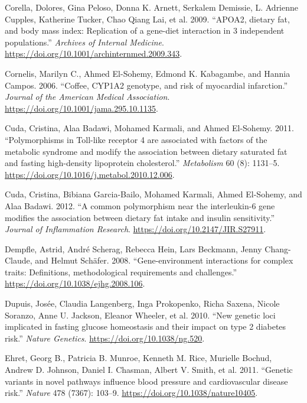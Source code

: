 \documentclass[]{article}
\begin{document}
\leavevmode\hypertarget{ref-Corella2009}{}%
Corella, Dolores, Gina Peloso, Donna K. Arnett, Serkalem Demissie, L.
Adrienne Cupples, Katherine Tucker, Chao Qiang Lai, et al. 2009.
``APOA2, dietary fat, and body mass index: Replication of a gene-diet
interaction in 3 independent populations.'' \emph{Archives of Internal
Medicine}. \url{https://doi.org/10.1001/archinternmed.2009.343}.

\leavevmode\hypertarget{ref-Cornelis2006}{}%
Cornelis, Marilyn C., Ahmed El-Sohemy, Edmond K. Kabagambe, and Hannia
Campos. 2006. ``Coffee, CYP1A2 genotype, and risk of myocardial
infarction.'' \emph{Journal of the American Medical Association}.
\url{https://doi.org/10.1001/jama.295.10.1135}.

\leavevmode\hypertarget{ref-Cuda2011}{}%
Cuda, Cristina, Alaa Badawi, Mohamed Karmali, and Ahmed El-Sohemy. 2011.
``Polymorphisms in Toll-like receptor 4 are associated with factors of
the metabolic syndrome and modify the association between dietary
saturated fat and fasting high-density lipoprotein cholesterol.''
\emph{Metabolism} 60 (8): 1131--5.
\url{https://doi.org/10.1016/j.metabol.2010.12.006}.

\leavevmode\hypertarget{ref-Cuda2012}{}%
Cuda, Cristina, Bibiana Garcia-Bailo, Mohamed Karmali, Ahmed El-Sohemy,
and Alaa Badawi. 2012. ``A common polymorphism near the interleukin-6
gene modifies the association between dietary fat intake and insulin
sensitivity.'' \emph{Journal of Inflammation Research}.
\url{https://doi.org/10.2147/JIR.S27911}.

\leavevmode\hypertarget{ref-Dempfle2008}{}%
Dempfle, Astrid, André Scherag, Rebecca Hein, Lars Beckmann, Jenny
Chang-Claude, and Helmut Schäfer. 2008. ``Gene-environment interactions
for complex traits: Definitions, methodological requirements and
challenges.'' \url{https://doi.org/10.1038/ejhg.2008.106}.

\leavevmode\hypertarget{ref-Dupuis2010}{}%
Dupuis, Josée, Claudia Langenberg, Inga Prokopenko, Richa Saxena, Nicole
Soranzo, Anne U. Jackson, Eleanor Wheeler, et al. 2010. ``New genetic
loci implicated in fasting glucose homeostasis and their impact on type
2 diabetes risk.'' \emph{Nature Genetics}.
\url{https://doi.org/10.1038/ng.520}.

\leavevmode\hypertarget{ref-Ehret2011}{}%
Ehret, Georg B., Patricia B. Munroe, Kenneth M. Rice, Murielle Bochud,
Andrew D. Johnson, Daniel I. Chasman, Albert V. Smith, et al. 2011.
``Genetic variants in novel pathways influence blood pressure and
cardiovascular disease risk.'' \emph{Nature} 478 (7367): 103--9.
\url{https://doi.org/10.1038/nature10405}.
\end{document}

